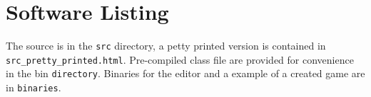 \section{Software Listing}

The source is in the \texttt{src} directory,  a petty printed version is contained in \lstinline{src_pretty_printed.html}. Pre-compiled class file are provided for convenience in the bin \texttt{directory}.  Binaries for the editor and a example of a created game are in \texttt{binaries}.
